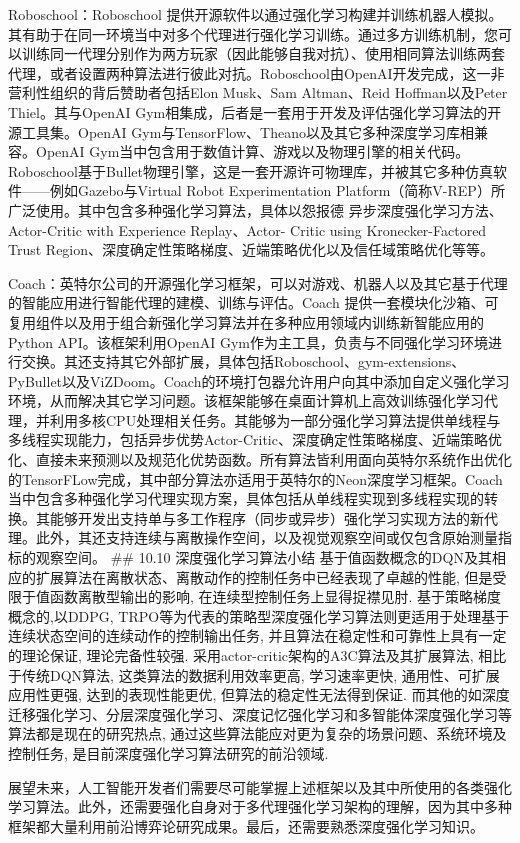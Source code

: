 Roboschool：Roboschool
提供开源软件以通过强化学习构建并训练机器人模拟。其有助于在同一环境当中对多个代理进行强化学习训练。通过多方训练机制，您可以训练同一代理分别作为两方玩家（因此能够自我对抗）、使用相同算法训练两套代理，或者设置两种算法进行彼此对抗。Roboschool由OpenAI开发完成，这一非营利性组织的背后赞助者包括Elon
Musk、Sam Altman、Reid Hoffman以及Peter Thiel。其与OpenAI
Gym相集成，后者是一套用于开发及评估强化学习算法的开源工具集。OpenAI
Gym与TensorFlow、Theano以及其它多种深度学习库相兼容。OpenAI
Gym当中包含用于数值计算、游戏以及物理引擎的相关代码。Roboschool基于Bullet物理引擎，这是一套开源许可物理库，并被其它多种仿真软件------例如Gazebo与Virtual
Robot Experimentation
Platform（简称V-REP）所广泛使用。其中包含多种强化学习算法，具体以怨报德
异步深度强化学习方法、Actor-Critic with Experience Replay、Actor- Critic
using Kronecker-Factored Trust
Region、深度确定性策略梯度、近端策略优化以及信任域策略优化等等。

Coach：英特尔公司的开源强化学习框架，可以对游戏、机器人以及其它基于代理的智能应用进行智能代理的建模、训练与评估。Coach
提供一套模块化沙箱、可复用组件以及用于组合新强化学习算法并在多种应用领域内训练新智能应用的Python
API。该框架利用OpenAI
Gym作为主工具，负责与不同强化学习环境进行交换。其还支持其它外部扩展，具体包括Roboschool、gym-extensions、PyBullet以及ViZDoom。Coach的环境打包器允许用户向其中添加自定义强化学习环境，从而解决其它学习问题。该框架能够在桌面计算机上高效训练强化学习代理，并利用多核CPU处理相关任务。其能够为一部分强化学习算法提供单线程与多线程实现能力，包括异步优势Actor-Critic、深度确定性策略梯度、近端策略优化、直接未来预测以及规范化优势函数。所有算法皆利用面向英特尔系统作出优化的TensorFLow完成，其中部分算法亦适用于英特尔的Neon深度学习框架。Coach
当中包含多种强化学习代理实现方案，具体包括从单线程实现到多线程实现的转换。其能够开发出支持单与多工作程序（同步或异步）强化学习实现方法的新代理。此外，其还支持连续与离散操作空间，以及视觉观察空间或仅包含原始测量指标的观察空间。
\#\# 10.10 深度强化学习算法小结
基于值函数概念的DQN及其相应的扩展算法在离散状态、离散动作的控制任务中已经表现了卓越的性能,
但是受限于值函数离散型输出的影响, 在连续型控制任务上显得捉襟见肘.
基于策略梯度概念的,以DDPG,
TRPO等为代表的策略型深度强化学习算法则更适用于处理基于连续状态空间的连续动作的控制输出任务,
并且算法在稳定性和可靠性上具有一定的理论保证, 理论完备性较强.
采用actor-critic架构的A3C算法及其扩展算法, 相比于传统DQN算法,
这类算法的数据利用效率更高, 学习速率更快, 通用性、可扩展应用性更强,
达到的表现性能更优, 但算法的稳定性无法得到保证.
而其他的如深度迁移强化学习、分层深度强化学习、深度记忆强化学习和多智能体深度强化学习等算法都是现在的研究热点,
通过这些算法能应对更为复杂的场景问题、系统环境及控制任务,
是目前深度强化学习算法研究的前沿领域.

展望未来，人工智能开发者们需要尽可能掌握上述框架以及其中所使用的各类强化学习算法。此外，还需要强化自身对于多代理强化学习架构的理解，因为其中多种框架都大量利用前沿博弈论研究成果。最后，还需要熟悉深度强化学习知识。
